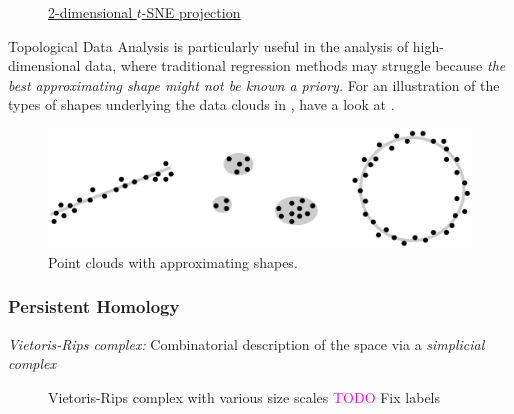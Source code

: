 \documentclass[11pt, a4paper]{amsart}
\begin{document}
\begin{figure}[ht]
\begin{minipage}[b]{0.4\linewidth}
		\caption{
			\href{https://lvdmaaten.github.io/tsne/}{2-dimensional $t$-SNE projection}
		}
		\label{fig:coil_20_tsne}
	\end{minipage}
\end{figure}

Topological Data Analysis is particularly useful in the analysis of high-dimensional data, where traditional regression methods may struggle because \emph{the best approximating shape might not be known a priory.}
For an illustration of the types of shapes underlying the data clouds in , have a look at .

\begin{figure}
	\centering
	\includegraphics[width=0.95\linewidth]{figures/topological_data_analysis/topological_data_analysis_collection_with_shapes}
	\caption{
		Point clouds with approximating shapes.
		\label{fig:topological_data_analysis_collection_with_shapes}
	}
\end{figure}

\subsubsection{Persistent Homology}

\emph{Vietoris-Rips complex:} 
Combinatorial description of the space via a \emph{simplicial complex}

\begin{center}
	\begin{figure}
		\centering
		\caption{
			Vietoris-Rips complex with various size scales
			\textcolor{magenta}{TODO} Fix labels
			\label{fig:vietoris_rips_complex}
		}
	\end{figure}
\end{center}
\end{document}
